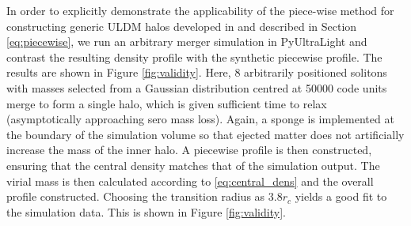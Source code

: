 \documentclass[a4paper,11pt]{article}
\begin{document}
In order to explicitly demonstrate the applicability of the piece-wise method for constructing generic ULDM halos developed in \cite{Robles:2018fur} and described in Section \ref{eq:piecewise}, we run an arbitrary merger simulation in PyUltraLight and contrast the resulting density profile with the synthetic piecewise profile. The results are shown in Figure \ref{fig:validity}. Here, 8 arbitrarily positioned solitons with masses selected from a Gaussian distribution centred at 50000 code units merge to form a single halo, which is given sufficient time to relax (asymptotically approaching sero mass loss). Again, a sponge is implemented at the boundary of the simulation volume so that ejected matter does not artificially increase the mass of the inner halo. A piecewise profile is then constructed, ensuring that the central density matches that of the simulation output. The virial mass is then calculated according to \ref{eq:central_dens} and the overall profile constructed. Choosing the transition radius as $3.8r_c$ yields a good fit to the simulation data. This is  shown in Figure \ref{fig:validity}.
\end{document}
